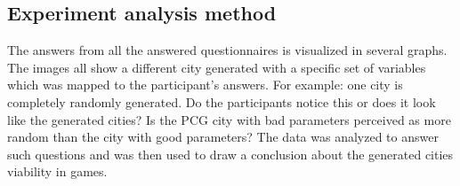 	\subsection{Experiment analysis method}
	The answers from all the answered questionnaires is visualized in several graphs. The images all show a different city generated with a specific set of variables which was mapped to the participant’s answers. For example: one city is completely randomly generated. Do the participants notice this or does it look like the generated cities? Is the PCG city with bad parameters perceived as more random than the city with good parameters? The data was analyzed to answer such questions and was then used to draw a conclusion about the generated cities viability in games.
	
	
	
	